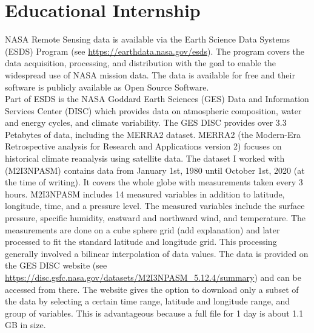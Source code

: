\documentclass[../00_main.tex]{subfiles}
\begin{document}
\section{Educational Internship}

NASA Remote Sensing data is available via the Earth Science Data Systems (ESDS)
Program (see \url{https://earthdata.nasa.gov/esds}). The program covers the
data acquisition, processing, and distribution with the goal to enable the
widespread use of NASA mission data. The data is available for free and their
software is publicly available as Open Source Software.\\ 
Part of ESDS is the NASA Goddard Earth Sciences (GES) Data and Information 
Services Center (DISC) which provides data on atmospheric composition, water
and energy cycles, and climate variability. 
The GES DISC provides over 3.3 Petabytes of data,
including the MERRA2 dataset. MERRA2 (the Modern-Era Retrospective analysis for
Research and Applications version 2) focuses on historical climate reanalysis
using satellite data. The dataset I worked with (M2I3NPASM) contains data from
January 1st, 1980 until October 1st, 2020 (at the time of writing). It covers
the whole globe with measurements taken every 3 hours.
M2I3NPASM includes 14 measured variables in addition to latitude, longitude,
time, and a pressure level. The measured variables include the surface pressure,
specific humidity, eastward and northward wind, and temperature. 
The measurements are done on a cube sphere grid (add explanation) and later
processed to fit the standard latitude and longitude grid. This processing
generally involved a bilinear interpolation of data values.\newline
The data is provided on the GES DISC website (see
\url{https://disc.gsfc.nasa.gov/datasets/M2I3NPASM_5.12.4/summary}) and can be
accessed from there. The website gives the option to download only a subset of
the data by selecting a certain time range, latitude and longitude range, and
group of variables. This is advantageous because a full file for 1 day is about
1.1 GB in size.
\end{document}
